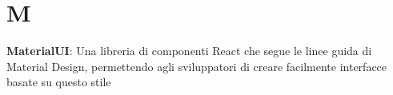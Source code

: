 \section*{M}
\textbf{MaterialUI}: Una libreria di componenti React che segue le linee guida di Material Design, permettendo agli sviluppatori di creare facilmente interfacce basate su questo stile\\